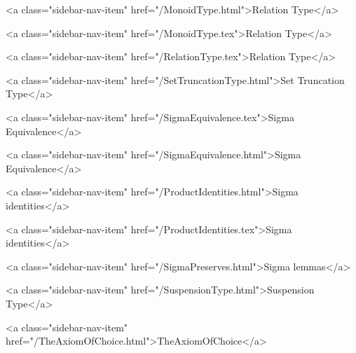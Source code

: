           <a class="sidebar-nav-item" href="/MonoidType.html">Relation Type</a>
        
      
    
      
        
          <a class="sidebar-nav-item" href="/MonoidType.tex">Relation Type</a>
        
      
    
      
        
          <a class="sidebar-nav-item" href="/RelationType.tex">Relation Type</a>
        
      
    
      
        
          <a class="sidebar-nav-item" href="/SetTruncationType.html">Set Truncation Type</a>
        
      
    
      
        
          <a class="sidebar-nav-item" href="/SigmaEquivalence.tex">Sigma Equivalence</a>
        
      
    
      
        
          <a class="sidebar-nav-item" href="/SigmaEquivalence.html">Sigma Equivalence</a>
        
      
    
      
        
          <a class="sidebar-nav-item" href="/ProductIdentities.html">Sigma identities</a>
        
      
    
      
        
          <a class="sidebar-nav-item" href="/ProductIdentities.tex">Sigma identities</a>
        
      
    
      
        
          <a class="sidebar-nav-item" href="/SigmaPreserves.html">Sigma lemmas</a>
        
      
    
      
        
          <a class="sidebar-nav-item" href="/SuspensionType.html">Suspension Type</a>
        
      
    
      
        
          <a class="sidebar-nav-item" href="/TheAxiomOfChoice.html">TheAxiomOfChoice</a>
        
      
    

